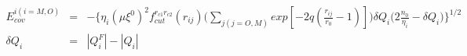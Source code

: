\documentclass[12pt]{article}
\begin{document}
\begin{eqnarray*}
E_{cov}^{i(i=M,O)} & = & - \Bigg\{\eta_i(\mu \xi^{0})^2 f_{cut}^{r_{c1}r_{c2}}(r_{ij})
\Bigg( \sum_{j(j=O,M)}{ exp[ -2q(\frac{r_{ij}}{r_0} - 1)] } \Bigg) 
\delta Q_i \Big( 2\frac{n_0}{\eta_i} - \delta Q_i \Big) \Bigg\}^{1/2} \\
\delta Q_i & = & | Q_i^{F} | - | Q_i |
\end{eqnarray*}
\end{document}
